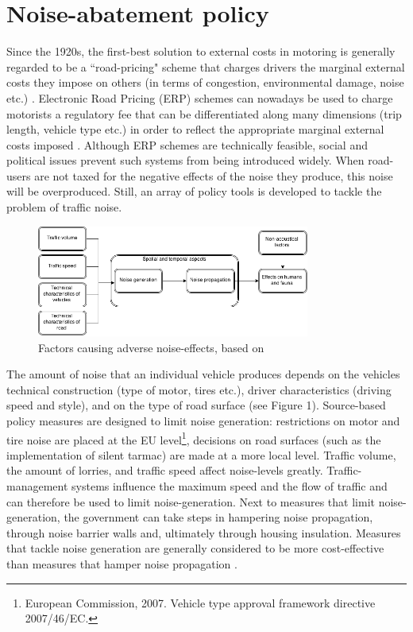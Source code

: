 \documentclass[a4paper]{scrartcl}
\begin{document}
\section{Noise-abatement policy}

Since the 1920s, the first-best solution to external costs in motoring is generally regarded to be a ``road-pricing" scheme that charges drivers the marginal external costs they impose on others (in terms of congestion, environmental damage, noise etc.) \citep{Pigou1924}. Electronic Road Pricing (ERP) schemes can nowadays be used to charge motorists a regulatory fee that can be differentiated along many dimensions (trip length, vehicle type etc.) in order to reflect the appropriate marginal external costs imposed \citep{Verhoef1995}. Although ERP schemes are technically feasible, social and political issues prevent such systems from being introduced widely. When road-users are not taxed for the negative effects of the noise they produce, this noise will be overproduced. Still, an array of policy tools is developed to tackle the problem of traffic noise.
	
\begin{figure}[h]
	\caption{Factors causing adverse noise-effects, based on \cite{Nijland2003}}
	\centering
	\includegraphics[width=0.8\textwidth]{Graph0}
\end{figure}
	
The amount of  noise that an individual vehicle produces depends on the vehicles technical construction (type of motor, tires etc.), driver characteristics (driving speed and style), and on the type of road surface (see Figure 1). Source-based policy measures are designed to limit noise generation: restrictions on motor and tire noise are placed at the EU level\footnote{European Commission, 2007.  Vehicle type approval framework directive 2007/46/EC.}, decisions on road surfaces (such as the implementation of silent tarmac) are made at a more local level. Traffic volume, the amount of lorries, and traffic speed affect noise-levels greatly. Traffic-management systems influence the maximum speed and the flow of traffic and can therefore be used to limit noise-generation. Next to measures that limit noise-generation, the government can take steps in hampering noise propagation, through noise barrier walls and, ultimately through housing insulation.  Measures that tackle noise generation are generally considered to be more cost-effective than measures that hamper noise propagation \citep{DanishRoadInstituteDRI2005,DenBoer2007}.
	
\end{document}
